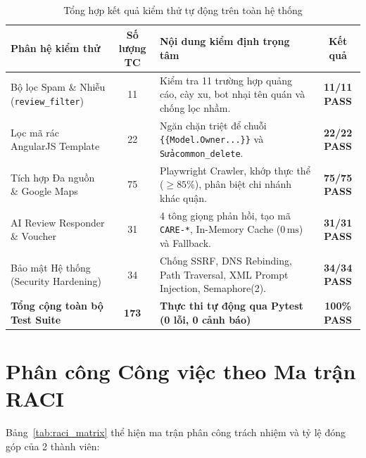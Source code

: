\documentclass[12pt, a4paper, oneside]{book}
\begin{document}
\begin{table}[H]
\centering
\caption{Tổng hợp kết quả kiểm thử tự động trên toàn hệ thống}
\label{tab:test_summary}
\vspace{0.15cm}
\footnotesize
\begin{tabularx}{\textwidth}{l c X c}
\toprule
\rowcolor{blue!8}
\textbf{Phân hệ kiểm thử} & \textbf{Số lượng TC} & \textbf{Nội dung kiểm định trọng tâm} & \textbf{Kết quả} \\
\midrule
Bộ lọc Spam \& Nhiễu (\texttt{review\_filter}) & 11 & Kiểm tra 11 trường hợp quảng cáo, cày xu, bot nhại tên quán và chống lọc nhầm. & \textbf{11/11 PASS} \\
Lọc mã rác AngularJS Template & 22 & Ngăn chặn triệt để chuỗi \texttt{\{\{Model.Owner...\}\}} và \texttt{Sửacommon\_delete}. & \textbf{22/22 PASS} \\
Tích hợp Đa nguồn \& Google Maps & 75 & Playwright Crawler, khớp thực thể ($\ge 85\%$), phân biệt chi nhánh khác quận. & \textbf{75/75 PASS} \\
AI Review Responder \& Voucher & 31 & 4 tông giọng phản hồi, tạo mã \texttt{CARE-*}, In-Memory Cache ($0\,\mathrm{ms}$) và Fallback. & \textbf{31/31 PASS} \\
Bảo mật Hệ thống (Security Hardening) & 34 & Chống SSRF, DNS Rebinding, Path Traversal, XML Prompt Injection, Semaphore(2). & \textbf{34/34 PASS} \\
\midrule
\rowcolor{blue!8}
\textbf{Tổng cộng toàn bộ Test Suite} & \textbf{173} & \textbf{Thực thi tự động qua Pytest (0 lỗi, 0 cảnh báo)} & \textbf{100\% PASS} \\
\bottomrule
\end{tabularx}
\end{table}

\section{Phân công Công việc theo Ma trận RACI}
Bảng~\ref{tab:raci_matrix} thể hiện ma trận phân công trách nhiệm và tỷ lệ đóng góp của 2 thành viên:
\end{document}
